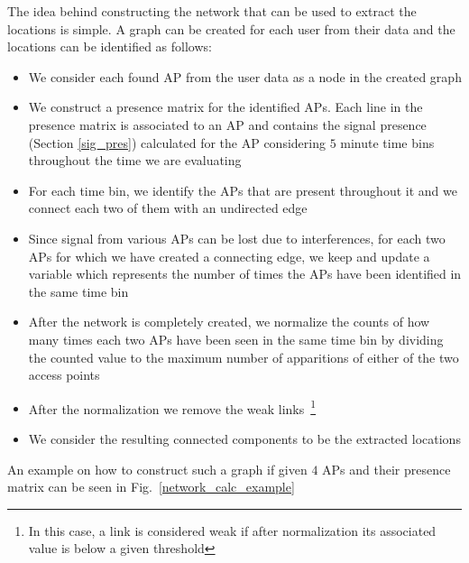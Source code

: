The idea behind constructing the network  that can be used to extract the
locations is simple. A graph can be created for each user from their data and
the locations can be identified as follows:
\begin{itemize}
  \item We consider each found AP from the user data as a node in the created
  graph
  \item We construct a presence matrix for the identified APs. Each line in the
  presence matrix is associated to an AP and contains the signal presence
  (Section \ref{sig_pres}) calculated for the AP considering $5$ minute time bins
  throughout the time we are evaluating
  \item For each time bin, we identify the APs that are present throughout it
  and we connect each two of them with an undirected edge
  \item Since signal from various APs can be lost due to interferences, for each
  two APs for which we have created a connecting edge, we keep and update a
  variable which represents the number of times the APs have been identified in
  the same time bin
  \item After the network is completely created, we normalize the counts of how
  many times each two APs have been seen in the same time bin by dividing the
  counted value to the maximum number of apparitions of either of the two access points
  \item After the normalization we remove the weak links~\footnote{In this
  case, a link is considered weak if after normalization its associated value is
  below a given threshold}
  \item We consider the resulting connected components to be the extracted
  locations
\end{itemize}

An example on how to construct such a graph if given $4$ APs and their
presence matrix can be seen in Fig.~\ref{network_calc_example}

